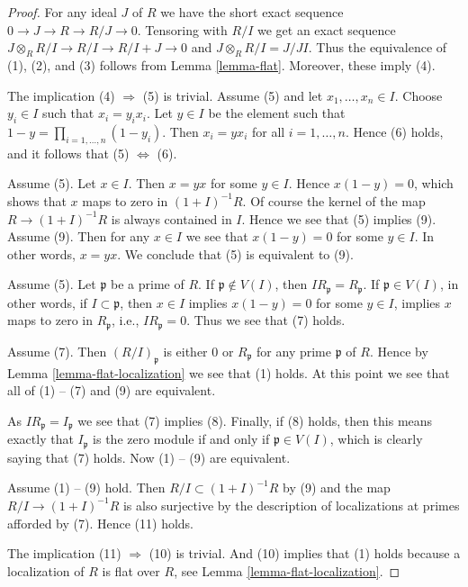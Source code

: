 \begin{proof}
For any ideal $J$ of $R$ we have the short exact sequence
$0 \to J \to R \to R/J \to 0$. Tensoring with $R/I$ we get
an exact sequence $J \otimes_R R/I \to R/I \to R/I + J \to 0$
and $J \otimes_R R/I = J/JI$. Thus the
equivalence of (1), (2), and (3) follows from
Lemma \ref{lemma-flat}. Moreover, these imply (4).

\medskip\noindent
The implication (4) $\Rightarrow$ (5) is trivial.
Assume (5) and let $x_1, \ldots, x_n \in I$.
Choose $y_i \in I$ such that $x_i = y_ix_i$.
Let $y \in I$ be the element such that
$1 - y = \prod_{i = 1, \ldots, n} (1 - y_i)$.
Then $x_i = yx_i$ for all $i = 1, \ldots, n$.
Hence (6) holds, and it follows that (5) $\Leftrightarrow$ (6).

\medskip\noindent
Assume (5). Let $x \in I$. Then $x = yx$ for some $y \in I$.
Hence $x(1 - y) = 0$, which shows that $x$ maps to zero in
$(1 + I)^{-1}R$. Of course the kernel of the map
$R \to (1 + I)^{-1}R$ is always contained in $I$. Hence we
see that (5) implies (9). Assume (9). Then for any $x \in I$
we see that $x(1 - y) = 0$ for some $y \in I$.
In other words, $x = yx$. We conclude that (5) is equivalent to (9).

\medskip\noindent
Assume (5). Let $\mathfrak p$ be a prime of $R$.
If $\mathfrak p \not \in V(I)$, then $IR_{\mathfrak p} = R_{\mathfrak p}$.
If $\mathfrak p \in V(I)$, in other words, if $I \subset \mathfrak p$,
then $x \in I$ implies $x(1 - y) = 0$ for some $y \in I$, implies
$x$ maps to zero in $R_{\mathfrak p}$, i.e., $IR_{\mathfrak p} = 0$.
Thus we see that (7) holds.

\medskip\noindent
Assume (7). Then $(R/I)_{\mathfrak p}$ is either $0$ or $R_{\mathfrak p}$
for any prime $\mathfrak p$ of $R$. Hence by
Lemma \ref{lemma-flat-localization}
we see that (1) holds. At this point we see that all of
(1) -- (7) and (9) are equivalent.

\medskip\noindent
As $IR_{\mathfrak p} = I_{\mathfrak p}$ we see that (7) implies (8).
Finally, if (8) holds, then this means exactly that $I_{\mathfrak p}$
is the zero module if and only if $\mathfrak p \in V(I)$, which
is clearly saying that (7) holds. Now (1) -- (9) are equivalent.

\medskip\noindent
Assume (1) -- (9) hold. Then $R/I \subset (1 + I)^{-1}R$ by (9) and
the map $R/I \to (1 + I)^{-1}R$ is also surjective by the description
of localizations at primes afforded by (7). Hence (11) holds.

\medskip\noindent
The implication (11) $\Rightarrow$ (10) is trivial.
And (10) implies that (1) holds because a localization of
$R$ is flat over $R$, see
Lemma \ref{lemma-flat-localization}.
\end{proof}

